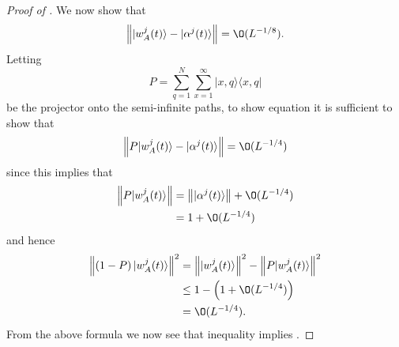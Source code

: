 \documentclass[../thesis-main/thesis-main]{subfiles}
\begin{document}
\begin{proof}[Proof of {}]
We now show that
\begin{equation}
\left\Vert |w_{A}^{j}(t)\rangle-|\alpha^{j}(t)\rangle\right\Vert =\O(L^{-{1}/{8}}).\label{eq:alpha_w_bound}\end{equation}
Letting \begin{equation}
P=\sum_{q=1}^{N}\sum_{x=1}^{\infty}|x,q\rangle\langle x,q|\end{equation}
be the projector onto the semi-infinite paths, to show equation 
it is sufficient to show that
\begin{equation}
\left\Vert P|w_{A}^{j}(t)\rangle-|\alpha^{j}(t)\rangle\right\Vert = \O(L^{-{1}/{4}})
\label{eq:bound_inside_lines}
\end{equation}
since this implies that
\begin{align*}
\left\Vert P|w_{A}^{j}(t)\rangle\right\Vert  & = \left\Vert |\alpha^{j}(t)\rangle\right\Vert + \O(L^{-{1}/{4}})\\
 & = 1+\O(L^{-{1}/{4}})
\end{align*}
and hence
\begin{align}
\left\Vert \left(1-P\right)|w_{A}^{j}(t)\rangle\right\Vert ^{2} & = \left\Vert |w_{A}^{j}(t)\rangle\right\Vert ^{2}-\left\Vert P|w_{A}^{j}(t)\rangle\right\Vert ^{2}\nonumber \\
 & \leq 1-\left(1+\O(L^{-{1}/{4}})\right)\nonumber \\
 & = \O(L^{-{1}/{4}}).\label{eq:bound_outside_lines}
\end{align}
From the above formula we now see that inequality 
implies .


\end{proof}
\end{document}
